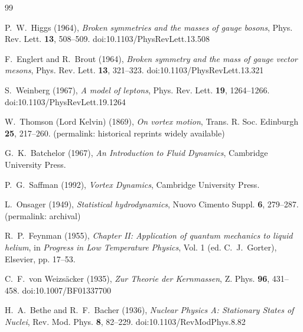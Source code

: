 \documentclass[11pt]{article}
\theoremstyle{definition}
\theoremstyle{plain}
\theoremstyle{remark}
\begin{document}
        \begin{thebibliography}{99}

            P.~W.~Higgs (1964),
            \emph{Broken symmetries and the masses of gauge bosons},
            Phys. Rev. Lett. \textbf{13}, 508--509.
            doi:10.1103/PhysRevLett.13.508

            F.~Englert and R.~Brout (1964),
            \emph{Broken symmetry and the mass of gauge vector mesons},
            Phys. Rev. Lett. \textbf{13}, 321--323.
            doi:10.1103/PhysRevLett.13.321

            S.~Weinberg (1967),
            \emph{A model of leptons},
            Phys. Rev. Lett. \textbf{19}, 1264--1266.
            doi:10.1103/PhysRevLett.19.1264

            W.~Thomson (Lord Kelvin) (1869),
            \emph{On vortex motion},
            Trans. R. Soc. Edinburgh \textbf{25}, 217--260.
            (permalink: historical reprints widely available)

            G.~K.~Batchelor (1967),
            \emph{An Introduction to Fluid Dynamics},
            Cambridge University Press.

            P.~G.~Saffman (1992),
            \emph{Vortex Dynamics},
            Cambridge University Press.

            L.~Onsager (1949),
            \emph{Statistical hydrodynamics},
            Nuovo Cimento Suppl. \textbf{6}, 279--287.
            (permalink: archival)

            R.~P.~Feynman (1955),
            \emph{Chapter II: Application of quantum mechanics to liquid helium},
            in \emph{Progress in Low Temperature Physics}, Vol. 1 (ed. C.~J.~Gorter),
            Elsevier, pp. 17--53.

            C.~F.~von Weizs\"acker (1935),
            \emph{Zur Theorie der Kernmassen},
            Z. Phys. \textbf{96}, 431--458.
            doi:10.1007/BF01337700

            H.~A.~Bethe and R.~F.~Bacher (1936),
            \emph{Nuclear Physics A: Stationary States of Nuclei},
            Rev. Mod. Phys. \textbf{8}, 82--229.
            doi:10.1103/RevModPhys.8.82


\end{thebibliography}
\end{document}
